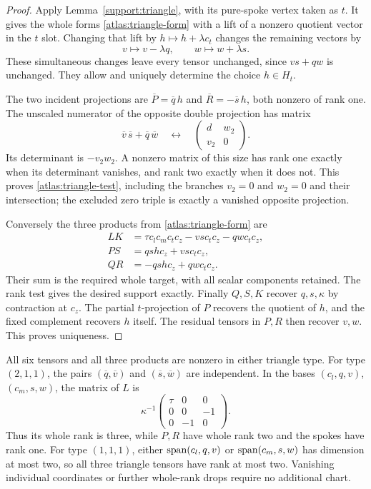\begin{proof}
Apply Lemma~\ref{support:triangle}, with its pure-spoke vertex taken as \(t\).
It gives the whole forms \eqref{atlas:triangle-form} with a lift of a
nonzero quotient vector in the \(t\) slot.  Changing that lift by
\(h\mapsto h+\lambda c_t\) changes the remaining vectors by
\[
 v\mapsto v-\lambda q,\qquad w\mapsto w+\lambda s.
\]
These simultaneous changes leave every tensor unchanged, since
\(vs+qw\) is unchanged.  They allow and uniquely determine the choice
\(h\in H_t\).

The two incident projections are
\(\overline P=\overline q\,h\) and
\(\overline R=-\overline s\,h\), both nonzero of rank one.  The unscaled
numerator of the opposite double projection has matrix
\[
 \overline v\,\overline s+\overline q\,\overline w
 \quad\longleftrightarrow\quad
 \begin{pmatrix}d&w_2\\v_2&0\end{pmatrix}.
\]
Its determinant is \(-v_2w_2\).  A nonzero matrix of this size has rank one
exactly when its determinant vanishes, and rank two exactly when it does
not.  This proves \eqref{atlas:triangle-test}, including the branches
\(v_2=0\) and \(w_2=0\) and their intersection; the excluded zero triple
is exactly a vanished opposite projection.

Conversely the three products from \eqref{atlas:triangle-form} are
\[
\begin{aligned}
 LK&=\tau c_lc_mc_tc_z-vsc_tc_z-qwc_tc_z,\\
 PS&=qshc_z+vsc_tc_z,\\
 QR&=-qshc_z+qwc_tc_z.
\end{aligned}
\]
Their sum is the required whole target, with all scalar components retained.
The rank test gives the desired support exactly.
Finally \(Q,S,K\) recover \(q,s,\kappa\) by contraction at \(c_z\).
The partial \(t\)-projection of \(P\) recovers the quotient of \(h\),
and the fixed complement recovers \(h\) itself.  The residual tensors in
\(P,R\) then recover \(v,w\).  This proves uniqueness.
\end{proof}

\begin{remark}\label{atlas:triangle-ranks}
All six tensors and all three products are nonzero in either triangle type.
For type \((2,1,1)\), the pairs \((\overline q,\overline v)\) and
\((\overline s,\overline w)\) are independent.  In the bases
\((c_l,q,v)\), \((c_m,s,w)\), the matrix of \(L\) is
\[
 \kappa^{-1}
 \begin{pmatrix}\tau&0&0\\0&0&-1\\0&-1&0\end{pmatrix}.
\]
Thus its whole rank is three, while \(P,R\) have whole rank two and the
spokes have rank one.  For type \((1,1,1)\), either
\(\operatorname{span}(c_l,q,v)\) or \(\operatorname{span}(c_m,s,w)\) has dimension at most two,
so all three triangle tensors have rank at most two.  Vanishing individual
coordinates or further whole-rank drops require no additional chart.
\end{remark}

